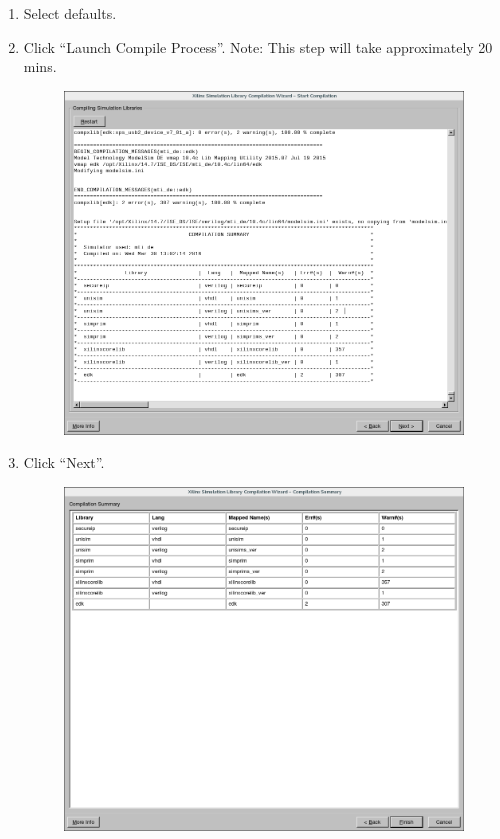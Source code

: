 \begin{flushleft}
\begin{enumerate}
		\item Select defaults.
		\item Click ``Launch Compile Process''.
			\subitem Note: This step will take approximately 20 mins.

	\begin{figure}[H]
	\centering\captionsetup{type=figure}\includegraphics[scale=0.5]{Xilinx_CompXLib_6_CompilationLog}
		\label{fig:wizard_page_6}
	\end{figure}

		\item Click ``Next''.

	\begin{figure}[H]
	\centering\captionsetup{type=figure}\includegraphics[scale=0.5]{Xilinx_CompXLib_7_CompilationSummary}
		\label{fig:wizard_page_7}
	\end{figure}



\end{enumerate}
\end{flushleft}
